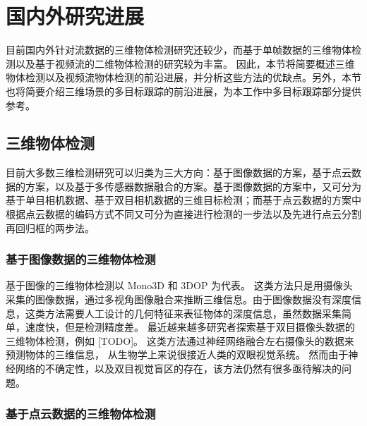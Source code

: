 \section{国内外研究进展}
\label{sec:realted_work}
目前国内外针对流数据的三维物体检测研究还较少，而基于单帧数据的三维物体检测以及基于视频流的二维物体检测的研究较为丰富。 因此，本节将简要概述三维物体检测以及视频流物体检测的前沿进展，并分析这些方法的优缺点。另外，本节也将简要介绍三维场景的多目标跟踪的前沿进展，为本工作中多目标跟踪部分提供参考。

\subsection{三维物体检测}
\label{3d_detect}
目前大多数三维检测研究可以归类为三大方向：基于图像数据的方案，基于点云数据的方案，以及基于多传感器数据融合的方案。基于图像数据的方案中，又可分为基于单目相机数据、基于双目相机数据的三维目标检测；而基于点云数据的方案中根据点云数据的编码方式不同又可分为直接进行检测的一步法以及先进行点云分割再回归框的两步法。

\subsubsection{基于图像数据的三维物体检测}

基于图像的三维物体检测以 Mono3D \cite{7780605} 和 3DOP \cite{chen20183d} 为代表。 这类方法只是用摄像头采集的图像数据，通过多视角图像融合来推断三维信息。由于图像数据没有深度信息，这类方法需要人工设计的几何特征来表征物体的深度信息，虽然数据采集简单，速度快，但是检测精度差。 最近越来越多研究者探索基于双目摄像头数据的三维物体检测，例如 [TODO]。 这类方法通过神经网络融合左右摄像头的数据来预测物体的三维信息， 从生物学上来说很接近人类的双眼视觉系统。 然而由于神经网络的不确定性，以及双目视觉盲区的存在，该方法仍然有很多亟待解决的问题。

\subsubsection{基于点云数据的三维物体检测}

